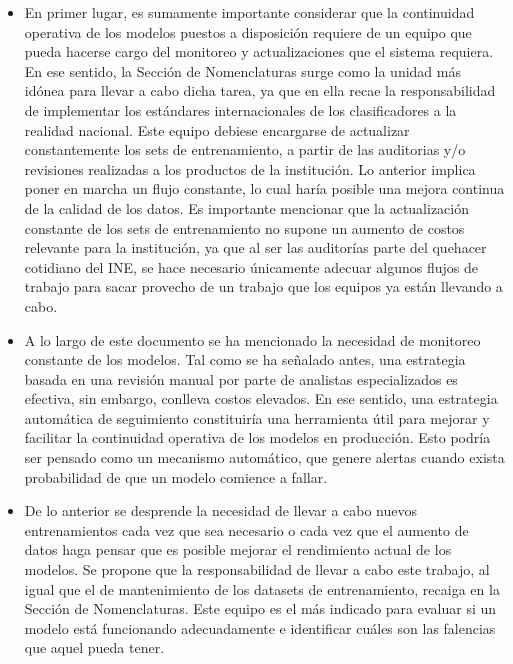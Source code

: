 \documentclass[
  12pt,
  spanish,
]{article}
\begin{document}
\begin{itemize}

  \item En primer lugar, es sumamente importante considerar que la continuidad operativa de los modelos puestos a disposición requiere de un equipo que pueda hacerse cargo del monitoreo y actualizaciones que el sistema requiera. En ese sentido, la Sección de Nomenclaturas surge como la unidad más idónea para llevar a cabo dicha tarea, ya que en ella recae la responsabilidad de implementar los estándares internacionales de los clasificadores a la realidad nacional. Este equipo debiese encargarse de actualizar constantemente los sets de entrenamiento, a partir de las auditorias y/o revisiones realizadas a los productos de la institución. Lo anterior implica poner en marcha un flujo constante, lo cual haría posible una mejora continua de la calidad de los datos. Es importante mencionar que la actualización constante de los sets de entrenamiento no supone un aumento de costos relevante para la institución, ya que al ser las auditorías parte del quehacer cotidiano del INE, se hace necesario únicamente adecuar algunos flujos de trabajo para sacar provecho de un trabajo que los equipos ya están llevando a cabo.  

  \item A lo largo de este documento se ha mencionado la necesidad de monitoreo constante de los modelos. Tal como se ha señalado antes, una estrategia basada en una revisión manual por parte de analistas especializados es efectiva, sin embargo, conlleva costos elevados. En ese sentido, una estrategia automática de seguimiento constituiría una herramienta útil para mejorar y facilitar la continuidad operativa de los modelos en producción. Esto podría ser pensado como un mecanismo automático, que genere alertas cuando exista probabilidad de que un modelo comience a fallar. 

  \item De lo anterior se desprende la necesidad de llevar a cabo nuevos entrenamientos cada vez que sea necesario o cada vez que el aumento de datos haga pensar que es posible mejorar el rendimiento actual de los modelos. Se propone que la responsabilidad de llevar a cabo este trabajo, al igual que el de mantenimiento de los datasets de entrenamiento, recaiga en la Sección de Nomenclaturas. Este equipo es el más indicado para evaluar si un modelo está funcionando adecuadamente e identificar cuáles son las falencias que aquel pueda tener.       


\end{itemize}
\end{document}
